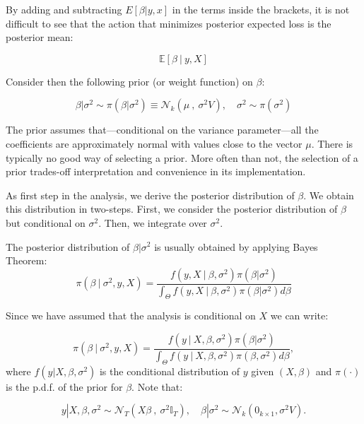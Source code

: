 \documentclass[12] {article}
\begin{document}
By adding and subtracting $E[\beta | y,x]$ in the terms inside the brackets, it is not difficult to see that the action that minimizes posterior expected loss is the posterior mean:

\[ \mathbb{E} [\beta \: | \: y,X] \]

\newpage

Consider then the following prior (or weight function) on $\beta$:

\begin{equation}
\beta | \sigma^2 \sim \pi (\beta | \sigma^2 ) \equiv \mathcal{N}_{k}( \mu \: , \: \sigma^2 V), \quad \sigma^2 \sim \pi(\sigma^2)
\end{equation}

\noindent The prior assumes that---conditional on the variance parameter---all the coefficients are approximately normal with values close to the vector $\mu$. There is typically no good way of selecting a prior. More often than not, the selection of a prior trades-off interpretation and convenience in its implementation. 

As first step in the analysis, we derive the posterior distribution of $\beta$. We obtain this distribution in two-steps. First, we consider the posterior distribution of $\beta$ but conditional on $\sigma^2$. Then, we integrate over $\sigma^2$. 

The posterior distribution of $\beta | \sigma^2$ is usually obtained by applying Bayes Theorem:
\begin{equation*}
\pi(\beta \: | \: \sigma^2, y, X ) = \frac{f(y,X \: | \: \beta, \sigma^2) \pi(\beta | \sigma^2 ) }{\int_{\Theta} f(y, X  \: | \: \beta, \sigma^2) \pi (\beta | \sigma^2) d \beta} 
\end{equation*}

\noindent Since we have assumed that the analysis is conditional on $X$ we can write:

\begin{equation}
\pi(\beta \: | \: \sigma^2, y, X ) = \frac{f(y \: | \: X, \beta, \sigma^2) \pi(\beta | \sigma^2 ) }{\int_{\Theta} f(y \: | \: X, \beta, \sigma^2) \pi (\beta, \sigma^2) d \beta}, 
\end{equation}
\noindent where $f(y | X, \beta, \sigma^2)$ is the conditional distribution of $y$ given $(X,\beta)$ and $\pi(\cdot)$ is the p.d.f. of the prior for $\beta$.  
\noindent Note that:

\[ y | X, \beta, \sigma^2 \sim \mathcal{N}_{T} (X\beta \: , \: \sigma^2 \mathbb{I}_T), \quad \beta | \sigma^2 \sim \mathcal{N}_{k}(0_{k \times 1}, \sigma^2 V).   \] 
\end{document}
